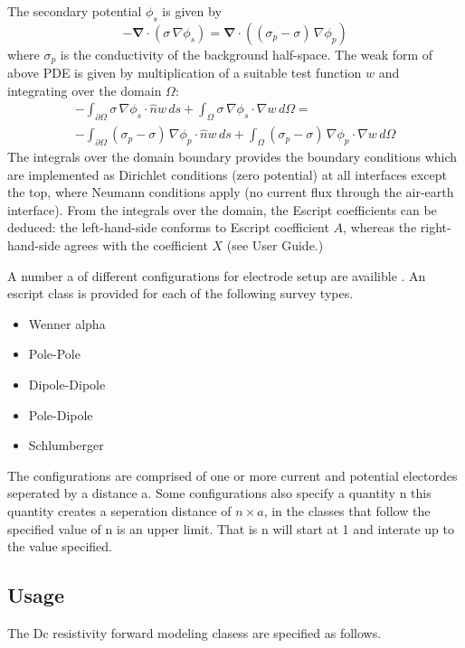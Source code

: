The secondary potential $\phi_s$ is given by
\begin{equation}\label{ref:dcres:eq4}
-\mathbf{\nabla}\cdot\left(\sigma\,\nabla \phi_s \right)  = 
 \mathbf{\nabla}\cdot\left( \left(\sigma_p-\sigma\right)\,\nabla \phi_p  \right)
\end{equation} 
where $\sigma_p$ is the conductivity of the background half-space.
The weak form of above PDE is given by multiplication of a suitable test function $w$ and integrating over the domain $\Omega$:
\begin{multline}\label{ref:dcres:eq5}
-\int_{\partial\Omega} \sigma\,\nabla \phi_s  \cdot \hat{n} w\,ds +
 \int_{\Omega} \sigma\,\nabla \phi_s  \cdot \nabla w\,d\Omega =\\
-\int_{\partial\Omega} \left(\sigma_p-\sigma\right)\,\nabla \phi_p  
\cdot \hat{n} w\,ds + \int_{\Omega} \left(\sigma_p-\sigma\right)\,\nabla \phi_p  \cdot \nabla w\,d\Omega 
\end{multline}
The integrals over the domain boundary provides the boundary conditions which are
implemented as Dirichlet conditions (zero potential) at all interfaces except the
top, where Neumann conditions apply (no current flux through the air-earth interface).
From the integrals over the domain, the Escript coefficients can be deduced: the 
left-hand-side conforms to Escript coefficient $A$, whereas the right-hand-side agrees
with the coefficient $X$ (see User Guide.)

A number a of different configurations for electrode setup are availible \cite[pg 5]{LOKE2014}.
An escript class is provided for each of the following survey types.
\begin{itemize}
\item Wenner alpha
\item Pole-Pole
\item Dipole-Dipole
\item Pole-Dipole
\item Schlumberger
\end{itemize}
The configurations are comprised of one or more current and potential electordes
seperated by a distance a. Some configurations also specify a quantity n this 
quantity creates a seperation distance of $n \times a$, in the classes that follow
the specified value of n is an upper limit. That is n will start at 1 and interate
up to the value specified.

\subsection{Usage}
The Dc resistivity forward modeling clasess are specified as follows.

